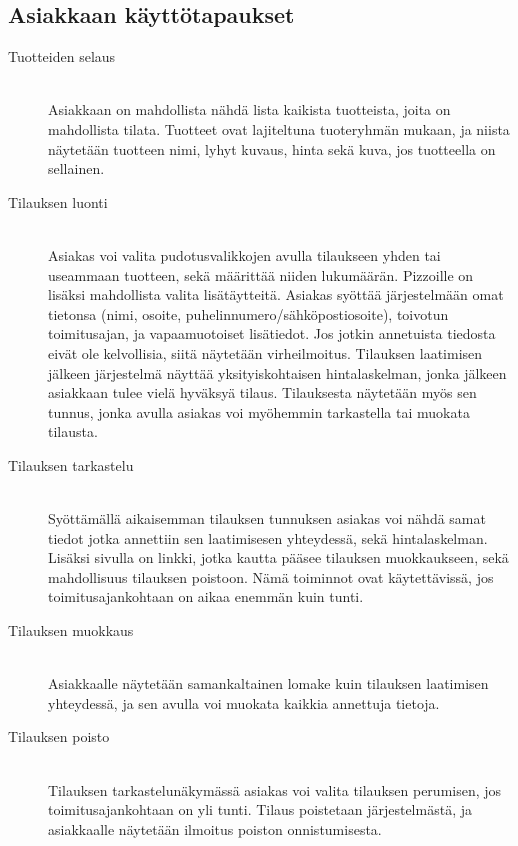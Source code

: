 \documentclass[a4paper, 12pt, finnish]{article}
\begin{document}
\subsection*{Asiakkaan käyttötapaukset}
\begin{description}
\item[Tuotteiden selaus]\mbox{}\\
Asiakkaan on mahdollista nähdä lista kaikista tuotteista, joita on mahdollista tilata. Tuotteet ovat lajiteltuna tuoteryhmän mukaan, ja niista näytetään tuotteen nimi, lyhyt kuvaus, hinta sekä kuva, jos tuotteella on sellainen.
\item[Tilauksen luonti]\mbox{}\\
Asiakas voi valita pudotusvalikkojen avulla tilaukseen yhden tai useammaan tuotteen, sekä määrittää niiden lukumäärän. Pizzoille on lisäksi mahdollista valita lisätäytteitä. Asiakas syöttää järjestelmään omat tietonsa (nimi, osoite, puhelinnumero/sähköpostiosoite), toivotun toimitusajan, ja vapaamuotoiset lisätiedot. Jos jotkin annetuista tiedosta eivät ole kelvollisia, siitä näytetään virheilmoitus. Tilauksen laatimisen jälkeen järjestelmä näyttää yksityiskohtaisen hintalaskelman, jonka jälkeen asiakkaan tulee vielä hyväksyä tilaus. Tilauksesta näytetään myös sen tunnus, jonka avulla asiakas voi myöhemmin tarkastella tai muokata tilausta.
\item[Tilauksen tarkastelu]\mbox{}\\
Syöttämällä aikaisemman tilauksen tunnuksen asiakas voi nähdä samat tiedot jotka annettiin sen laatimisesen yhteydessä, sekä hintalaskelman. Lisäksi sivulla on linkki, jotka kautta pääsee tilauksen muokkaukseen, sekä mahdollisuus tilauksen poistoon. Nämä toiminnot ovat käytettävissä, jos toimitusajankohtaan on aikaa enemmän kuin tunti.
\item[Tilauksen muokkaus]\mbox{}\\
Asiakkaalle näytetään samankaltainen lomake kuin tilauksen laatimisen yhteydessä, ja sen avulla voi muokata kaikkia annettuja tietoja.
\item[Tilauksen poisto]\mbox{}\\
Tilauksen tarkastelunäkymässä asiakas voi valita tilauksen perumisen, jos toimitusajankohtaan on yli tunti. Tilaus poistetaan järjestelmästä, ja asiakkaalle näytetään ilmoitus poiston onnistumisesta.
\end{description}
\end{document}
